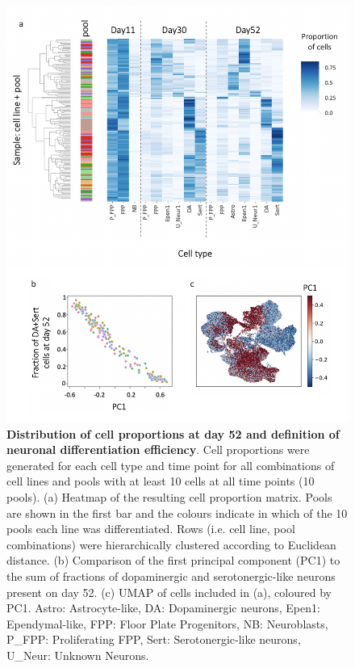 \begin{figure}[htbp]
\centering
\includegraphics[width=14cm]{Chapter5/Fig/neuroseq_define_diff_efficiency.png}
\caption[Definition of neuronal differentiation efficiency]{\textbf{Distribution of cell proportions at day 52 and definition of neuronal differentiation efficiency}.
Cell proportions were generated for each cell type and time point for all combinations of cell lines and pools with at least 10 cells at all time points (10 pools). 
(a) Heatmap of the resulting cell proportion matrix. 
Pools are shown in the first bar and the colours indicate in which of the 10 pools each line was differentiated. 
Rows (i.e. cell line, pool combinations) were hierarchically clustered according to Euclidean distance. 
(b) Comparison of the first principal component (PC1) to the sum of fractions of dopaminergic and serotonergic-like neurons present on day 52.
(c) UMAP of cells included in (a), coloured by PC1.
Astro: Astrocyte-like, DA: Dopaminergic neurons, Epen1: Ependymal-like, FPP: Floor Plate Progenitors, NB: Neuroblasts, P\_FPP: Proliferating FPP, Sert: Serotonergic-like neurons, U\_Neur: Unknown Neurons.}
\label{fig:neuroseq_diff_efficiency}
\end{figure}

